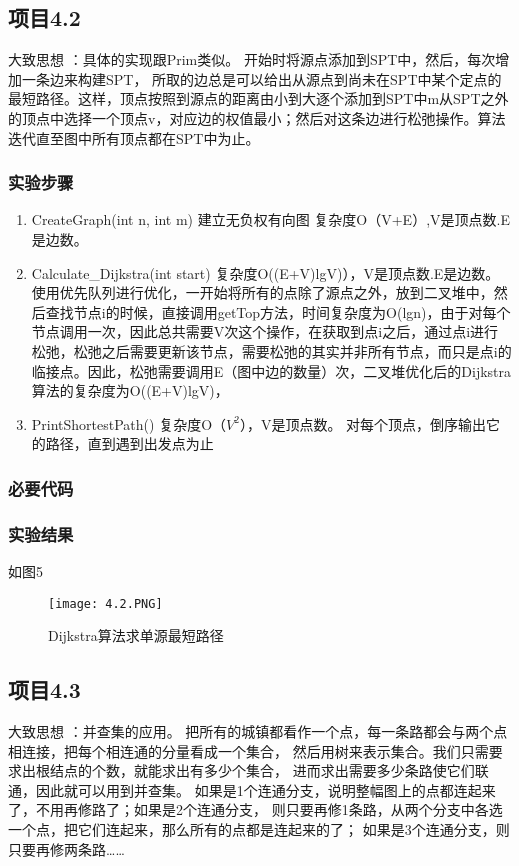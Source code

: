 \subsection{项目4.2}
大致思想 ：具体的实现跟Prim类似。
  开始时将源点添加到SPT中，然后，每次增加一条边来构建SPT， 所取的边总是可以给出从源点到尚未在SPT中某个定点的最短路径。这样，顶点按照到源点的距离由小到大逐个添加到SPT中m从SPT之外的顶点中选择一个顶点v，对应边的权值最小；然后对这条边进行松弛操作。算法迭代直至图中所有顶点都在SPT中为止。
\subsubsection{实验步骤}
\begin{enumerate}
\item CreateGraph(int n, int m) 建立无负权有向图 复杂度O（V+E）,V是顶点数.E是边数。      
\item Calculate\_Dijkstra(int start) 复杂度O((E+V)lgV)），V是顶点数.E是边数。           使用优先队列进行优化，一开始将所有的点除了源点之外，放到二叉堆中，然后查找节点i的时候，直接调用getTop方法，时间复杂度为O(lgn)，由于对每个节点调用一次，因此总共需要V次这个操作，在获取到点i之后，通过点i进行松弛，松弛之后需要更新该节点，需要松弛的其实并非所有节点，而只是点i的临接点。因此，松弛需要调用E（图中边的数量）次，二叉堆优化后的Dijkstra算法的复杂度为O((E+V)lgV)，        
\item PrintShortestPath() 复杂度O（$V^2$），V是顶点数。              对每个顶点，倒序输出它的路径，直到遇到出发点为止
\end{enumerate}
\subsubsection{必要代码}


\subsubsection{实验结果}如图5
	\begin{figure}[!bthp]
	\centering
        \texttt{[image: 4.2.PNG]}
        \caption{Dijkstra算法求单源最短路径}
      \end{figure}

\subsection{项目4.3}
大致思想 ：并查集的应用。    把所有的城镇都看作一个点，每一条路都会与两个点相连接，把每个相连通的分量看成一个集合，
  然后用树来表示集合。我们只需要求出根结点的个数，就能求出有多少个集合，
  进而求出需要多少条路使它们联通，因此就可以用到并查集。
  如果是1个连通分支，说明整幅图上的点都连起来了，不用再修路了；如果是2个连通分支，
  则只要再修1条路，从两个分支中各选一个点，把它们连起来，那么所有的点都是连起来的了；
  如果是3个连通分支，则只要再修两条路……

